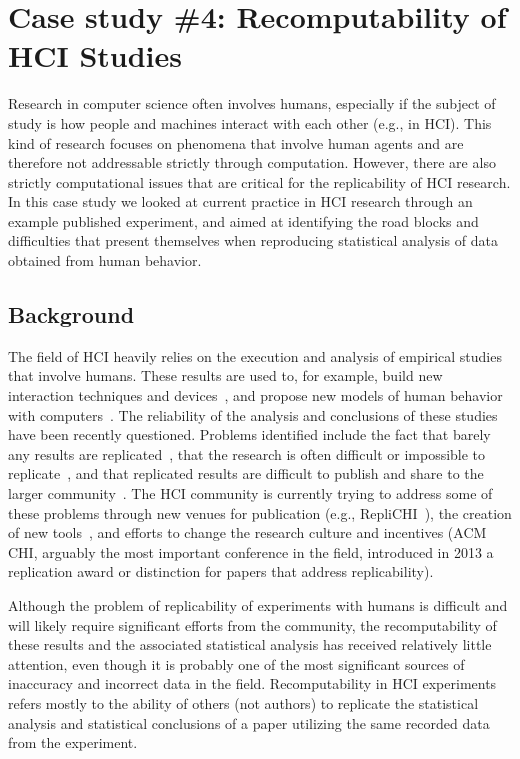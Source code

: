 \section{Case study \#4: Recomputability of HCI Studies}
\label{s:group4}

Research in computer science often involves humans, especially if the subject of study is how people and machines interact with each other (e.g., in HCI). This kind of research focuses on phenomena that involve human agents and are therefore not addressable strictly through computation. However, there are also strictly computational issues that are critical for the replicability of HCI research. In this case study we looked at current practice in HCI research through an example published experiment, and aimed at identifying the road blocks and difficulties that present themselves when reproducing statistical analysis of data obtained from human behavior.  

\subsection{Background}
The field of HCI heavily relies on the execution and analysis of empirical studies that involve humans. These results are used to, for example, build new interaction techniques and devices~\cite{Nacenta:2008}, and propose new models of human behavior with computers~\cite{Shoemaker:2012}. The reliability of the analysis and conclusions of these studies have been recently questioned. Problems identified include the fact that barely any results are replicated~\cite{hornbaek:replications}, that the research is often difficult or impossible to replicate~\cite{wilson:2011}, and that replicated results are difficult to publish and share to the larger community~\cite{wilson:2012}. The HCI community is currently trying to address some of these problems through new venues for publication (e.g., RepliCHI~\cite{wilson:2013,wilson:2014}), the creation of new tools~\cite{Mackay:2007}, and efforts to change the research culture and incentives (ACM CHI, arguably the most important conference in the field, introduced in 2013 a replication award or distinction for papers that address replicability).

Although the problem of replicability of experiments with humans is difficult and will likely require significant efforts from the community, the recomputability of these results and the associated statistical analysis has received relatively little attention, even though it is probably one of the most significant sources of inaccuracy and incorrect data in the field. Recomputability in HCI experiments refers mostly to the ability of others (not authors) to replicate the statistical analysis and statistical conclusions of a paper utilizing the same recorded data from the experiment. 

